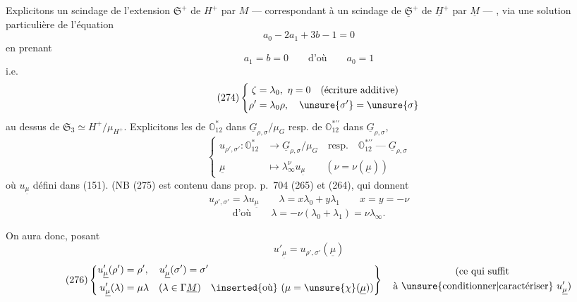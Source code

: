 
Explicitons un scindage de l'extension
$\mathfrak S^+$ de $H^+$ par $M$
--- correspondant à un scindage de
$\underline{\mathfrak S}^+$ de $\underline H^+$
par $\underline M$ --- , via une solution particulière de l'équation
\[
\tag{273}
a_0-2a_1+3b-1=0
\]
en prenant
\[
a_1=b=0\qquad\text{d'où}\qquad a_0=1
\]
i.e.
\[
\tag{274}
\left\{\begin{aligned}
\zeta&=\lambda_0,\ \eta=0\quad\text{(écriture additive)}\\
\rho'&=\lambda_0\rho,\quad\unsure{\sigma'}=\unsure{\sigma}
\end{aligned}\right.
\]
au dessus de $\mathfrak S_3
\simeq H^+/\mu_{H^+}$.
Explicitons les 
 de $\mathbb O_{12}^*$ dans
$\underline G_{\rho,\sigma}/\mu_G$ resp. de
$\mathbb O_{12}^{*\prime\prime}$ dans $\underline G_{\rho,\sigma}$\unsure{;},
\[
\tag{275}
\left\{\begin{aligned}
u_{\rho',\sigma'}:\mathbb O_{12}^*&\longrightarrow
\underline G_{\rho,\sigma}/\mu_G
\quad\text{resp.}\quad\mathbb O_{12}^{*\prime\prime}
\mathrel{\text{---}}\underline G_{\rho,\sigma}
\\
\underline\mu&\longmapsto\lambda_\infty^{\nu}u_{\underline\mu}
\qquad(\nu=\nu(\underline\mu))
\end{aligned}\right.
\]
où $u_{\underline\mu}$ défini dans (151).
(NB\unsure{\S} (275) est contenu dans prop. p.~704
(265) et (264), qui donnent
\[
u_{\rho',\sigma'}=\lambda u_{\underline\mu}\qquad
\lambda=x\lambda_0+y\lambda_1\qquad x=y=-\nu
\]
\[
\text{d'où}\qquad\lambda=-\nu(\lambda_0+\lambda_1)=\nu\lambda_\infty.
\]

On aura donc, posant
\[
u'_{\underline\mu}=u_{\rho',\sigma'}(\underline\mu)
\]
\[
\tag{276}
\left\{\begin{aligned}
u'_{\underline\mu}(\rho')&=\rho',\quad
u'_{\underline\mu}(\sigma')=\sigma'\\
u'_{\underline\mu}(\lambda)&=\mu\lambda\quad
(\lambda\in\Gamma\underline M)
\quad\inserted{\text{où}}\ (\mu=\unsure{\chi}(\underline\mu))
\end{aligned}\right\}
\quad\begin{gathered}
\text{(ce qui suffit}\\
\text{à \unsure{conditionner|caractériser}}\ u'_{\underline\mu})
\end{gathered}
\]


